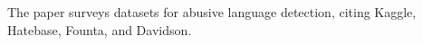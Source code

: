 The paper surveys datasets for abusive language detection, citing Kaggle, Hatebase, Founta, and Davidson.
